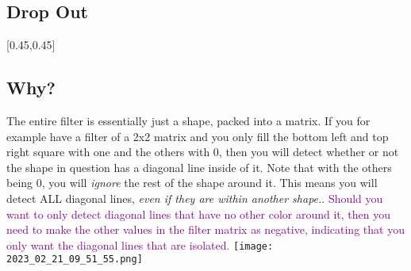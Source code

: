 \documentclass[main.tex,fontsize=8pt,paper=a4,paper=portrait,DIV=calc,]{scrartcl}
\begin{document}
\subsection{Drop Out}
[0.45,0.45]

\subsection{Why?}
The entire filter is essentially just a shape, packed into a matrix.\newline
If you for example have a filter of a 2x2 matrix and you only fill the bottom left and top right square with one and the others with 0, then you will detect whether or not the shape in question has a diagonal line inside of it.\newline
Note that with the others being 0, you will \emph{ignore} the rest of the shape around it. This means you will detect ALL diagonal lines, \emph{even if they are within another shape.}.\newline
\textcolor{purple}{Should you want to only detect diagonal lines that have no other color around it, then you need to make the other values in the filter matrix as negative, indicating that you only want the diagonal lines that are isolated.}\newline
\texttt{[image: 2023\_02\_21\_09\_51\_55.png]}
\end{document}
